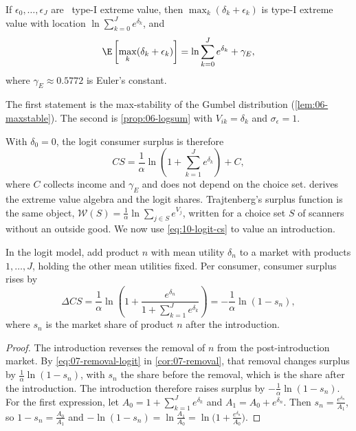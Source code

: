 \begin{lemma}\label{lem:10-logsum}
If $\epsilon_0,\dots,\epsilon_J$ are \iid\ type-I extreme value, then $\max_k(\delta_k + \epsilon_k)$ is
type-I extreme value with location $\ln\sum_{k=0}^{J} e^{\delta_k}$, and
\begin{equation}\label{eq:10-logsum}
\E\left[\max_k(\delta_k + \epsilon_k)\right] = \ln\sum_{k=0}^{J} e^{\delta_k} + \gamma_E,
\end{equation}
where $\gamma_E \approx 0.5772$ is Euler's constant.
\end{lemma}

The first statement is the max-stability of the Gumbel distribution (\cref{lem:06-maxstable}). The second is
\cref{prop:06-logsum} with $V_{ik} = \delta_k$ and $\sigma_\epsilon = 1$.

With $\delta_0 = 0$, the logit consumer surplus is therefore
\begin{equation}\label{eq:10-logit-cs}
CS = \frac{1}{\alpha}\ln\left(1 + \sum_{k=1}^{J}e^{\delta_k}\right) + C,
\end{equation}
where $C$ collects income and $\gamma_E$ and does not depend on the choice set.  derives the
extreme value algebra and the logit shares. Trajtenberg's surplus function is the
same object, $\mathcal{W}(S) = \frac{1}{\alpha}\ln\sum_{j\in S}e^{V_j}$, written for a choice set $S$ of scanners
without an outside good. We now use \eqref{eq:10-logit-cs} to value an introduction.

\begin{proposition}\label{prop:10-logit-newgood}
In the logit model, add product $n$ with mean utility $\delta_n$ to a market with products $1,\dots,J$, holding
the other mean utilities fixed. Per consumer, consumer surplus rises by
\begin{equation}\label{eq:10-logit-newgood}
\Delta CS = \frac{1}{\alpha}\ln\left(1 + \frac{e^{\delta_n}}{1 + \sum_{k=1}^{J}e^{\delta_k}}\right)
= -\frac{1}{\alpha}\ln(1 - s_n),
\end{equation}
where $s_n$ is the market share of product $n$ after the introduction.
\end{proposition}

\begin{proof}
The introduction reverses the removal of $n$ from the post-introduction market. By \eqref{eq:07-removal-logit} in
\cref{cor:07-removal}, that removal changes surplus by $\frac{1}{\alpha}\ln(1 - s_n)$, with $s_n$ the share before
the removal, which is the share after the introduction. The introduction therefore raises surplus by
$-\frac{1}{\alpha}\ln(1 - s_n)$. For the first expression, let $A_0 = 1 + \sum_{k=1}^{J}e^{\delta_k}$ and
$A_1 = A_0 + e^{\delta_n}$. Then $s_n = \frac{e^{\delta_n}}{A_1}$, so $1 - s_n = \frac{A_0}{A_1}$ and
$-\ln(1 - s_n) = \ln\frac{A_1}{A_0} = \ln\big(1 + \frac{e^{\delta_n}}{A_0}\big)$.
\end{proof}

